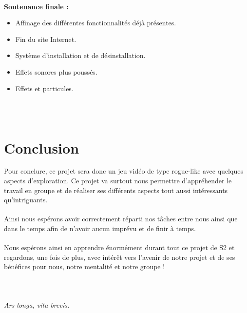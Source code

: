 \documentclass{article}
\begin{document}
\ \pagebreak

\noindent \large\textbf{Soutenance finale :}
\normalsize
\begin{itemize}
    \item Affinage des différentes fonctionnalités déjà présentes.
    \item Fin du site Internet.
    \item Système d'installation et de désinstallation.
    \item Effets sonores plus poussés.
    \item Effets et particules.
\end{itemize}

\ \\ \\

\section{Conclusion}

Pour conclure, ce projet sera donc un jeu vidéo de type rogue-like avec quelques aspects d'exploration. Ce projet va surtout nous permettre d'appréhender le travail en groupe et de réaliser ses différents aspects tout aussi intéressants qu'intriguants. \\ \\
Ainsi nous espérons avoir correctement réparti nos tâches entre nous ainsi que dans le temps afin de n'avoir aucun imprévu et de finir à temps. \\ \\
Nous espérons ainsi en apprendre énormément durant tout ce projet de S2 et regardons, une fois de plus, avec intérêt vers l'avenir de notre projet et de ses bénéfices pour nous, notre mentalité et notre groupe ! \\ \\ \\ \\

\centering \textit{Ars longa, vita brevis.}
\end{document}
